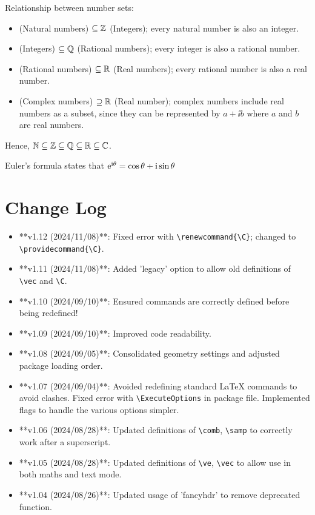 \documentclass[twoside]{article}
\begin{document}
\begin{center}
    \begin{minipage}{0.7\textwidth}
        Relationship between number sets:
        \begin{itemize}
          \item \N{} (Natural numbers) $\subseteq \mathbb{Z}$ (Integers); every natural number is also an integer.
          \item \Z{} (Integers) $\subseteq \mathbb{Q}$ (Rational numbers); every integer is also a rational number.
          \item \Q{} (Rational numbers) $\subseteq \mathbb{R}$ (Real numbers); every rational number is also a real number.
          \item \Complex{} (Complex numbers) $\supseteq \mathbb{R}$ (Real number); complex numbers include real numbers as a subset, since they can be represented by $a+\ii b$ where $a$ and $b$ are real numbers.
        \end{itemize}
        Hence, $\mathbb{N}\subseteq\mathbb{Z}\subseteq\mathbb{Q}\subseteq\mathbb{R}\subseteq\mathbb{C}$.
        
        Euler's formula states that $\mathrm{e}^{\mathrm{i}\theta} = \cos\theta + \mathrm{i}\sin\theta$
    \end{minipage}
\end{center}
\section{Change Log}

\begin{itemize}
\item **v1.12 (2024/11/08)**: Fixed error with \verb|\renewcommand{\C}|; changed to \verb|\providecommand{\C}|.
\item **v1.11 (2024/11/08)**: Added 'legacy' option to allow old definitions of \verb|\vec| and \verb|\C|.
\item **v1.10 (2024/09/10)**: Ensured commands are correctly defined before being redefined!
\item **v1.09 (2024/09/10)**: Improved code readability.
\item **v1.08 (2024/09/05)**: Consolidated geometry settings and adjusted package loading order.
\item **v1.07 (2024/09/04)**: Avoided redefining standard LaTeX commands to avoid clashes. Fixed error with \verb|\ExecuteOptions| in package file. Implemented flags to handle the various options simpler.
\item **v1.06 (2024/08/28)**: Updated definitions of \verb|\comb|, \verb|\samp| to correctly work after a superscript.
\item **v1.05 (2024/08/28)**: Updated definitions of \verb|\ve|, \verb|\vec| to allow use in both maths and text mode.
\item **v1.04 (2024/08/26)**: Updated usage of 'fancyhdr' to remove deprecated function.
\end{itemize}
\end{document}
